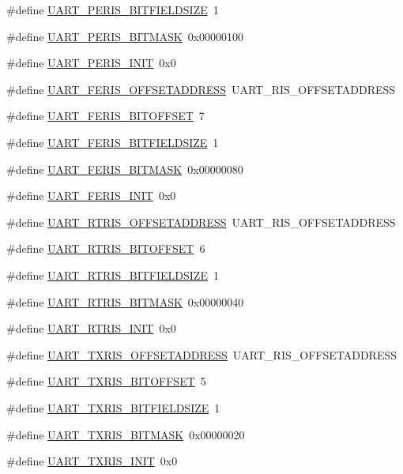 \begin{DoxyCompactItemize}
\item 
\#define \hyperlink{a00575_abf49abec0446d6cdddbac40dab7d24dc}{UART\_\-PERIS\_\-BITFIELDSIZE}~1
\item 
\#define \hyperlink{a00575_ab6b77bcc034b76f5bd5e822d7222a2ab}{UART\_\-PERIS\_\-BITMASK}~0x00000100
\item 
\#define \hyperlink{a00575_aed2bc1f9f10b829cc66b4b59d77e9dae}{UART\_\-PERIS\_\-INIT}~0x0
\item 
\#define \hyperlink{a00575_a85974d3a2ecc8981197981a6c0487e1d}{UART\_\-FERIS\_\-OFFSETADDRESS}~UART\_\-RIS\_\-OFFSETADDRESS
\item 
\#define \hyperlink{a00575_aa86e82529d5609dfdc6410248a01a8f3}{UART\_\-FERIS\_\-BITOFFSET}~7
\item 
\#define \hyperlink{a00575_a801ff0570fa8a0cf47846a2e72153f55}{UART\_\-FERIS\_\-BITFIELDSIZE}~1
\item 
\#define \hyperlink{a00575_a9f24b73a79bfdd8268f04bf8ca8893cc}{UART\_\-FERIS\_\-BITMASK}~0x00000080
\item 
\#define \hyperlink{a00575_aecb0a92bf6d9bf52497442ed14059d6a}{UART\_\-FERIS\_\-INIT}~0x0
\item 
\#define \hyperlink{a00575_ac121b1665e826f92ef0195c09203b5f6}{UART\_\-RTRIS\_\-OFFSETADDRESS}~UART\_\-RIS\_\-OFFSETADDRESS
\item 
\#define \hyperlink{a00575_a59f4f71e659883834ecf44c162914859}{UART\_\-RTRIS\_\-BITOFFSET}~6
\item 
\#define \hyperlink{a00575_a55b20f3d35d962f42756c266d1fa16db}{UART\_\-RTRIS\_\-BITFIELDSIZE}~1
\item 
\#define \hyperlink{a00575_ac06470a9c8fa58957a5cd9c29eb5daed}{UART\_\-RTRIS\_\-BITMASK}~0x00000040
\item 
\#define \hyperlink{a00575_ae1c0cb73768da4d7a2a6301f689f1add}{UART\_\-RTRIS\_\-INIT}~0x0
\item 
\#define \hyperlink{a00575_a546fb9ee3fbb804797b61e3c4377a4a8}{UART\_\-TXRIS\_\-OFFSETADDRESS}~UART\_\-RIS\_\-OFFSETADDRESS
\item 
\#define \hyperlink{a00575_abfb4a72a72e0f05d65405b04a5cf4c19}{UART\_\-TXRIS\_\-BITOFFSET}~5
\item 
\#define \hyperlink{a00575_a020e695d0e415519c95f924bc9f7d491}{UART\_\-TXRIS\_\-BITFIELDSIZE}~1
\item 
\#define \hyperlink{a00575_a640cbab7b80951d1cf3652438ac397d3}{UART\_\-TXRIS\_\-BITMASK}~0x00000020
\item 
\#define \hyperlink{a00575_a9536ef0c42e5569dd53275894ebfb33d}{UART\_\-TXRIS\_\-INIT}~0x0

\end{DoxyCompactItemize}
